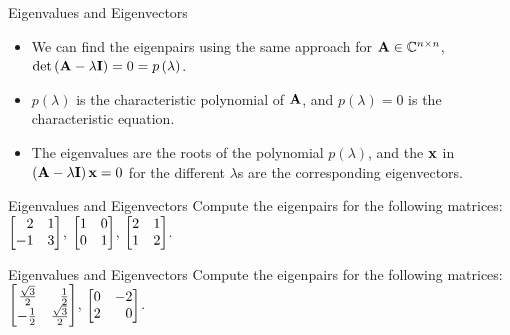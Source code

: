 \documentclass[aspectratio=169]{beamer}
\let\olditem\item
\renewcommand{\item}{\setlength{\itemsep}{\fill}\olditem}
\def\mf{\ensuremath\mathbf}
\def\mb{\ensuremath\mathbb}
\def\bmx{\ensuremath\begin{bmatrix*}[r]}
\def\emx{\ensuremath\end{bmatrix*}}
\begin{document}
\begin{frame}{Eigenvalues and Eigenvectors}
\begin{itemize}
    \item We can find the eigenpairs using the same approach for $\mf{A} \in \mb{C}^{n \times n}$, $\det \left(\mf{A} - \lambda\mf{I}\right) = 0 = p\left(\lambda\right)$.

    \item $p\left(\lambda\right)$ is the characteristic polynomial of $\mf{A}$, and $p\left(\lambda\right) = 0$ is the characteristic equation.

    \item The eigenvalues are the roots of the polynomial $p\left(\lambda \right)$, and the $\mf{x}$ in $\left(\mf{A} - \lambda\mf{I}\right)\mf{x} = 0$ for the different $\lambda$s are the corresponding eigenvectors. 
\end{itemize}
\end{frame}


\begin{frame}[t]{Eigenvalues and Eigenvectors}
Compute the eigenpairs for the following matrices: $\bmx2 & 1\\-1 & 3\emx$, $\bmx1 & 0\\0 & 1\emx$, $\bmx2 & 1\\ 1 & 2\emx$.
\end{frame}


\begin{frame}[t]{Eigenvalues and Eigenvectors}
Compute the eigenpairs for the following matrices: $\bmx\frac{\sqrt{3}}{2} & \frac{1}{2}\\-\frac{1}{2} & \frac{\sqrt{3}}{2}\emx$, $\bmx 0 & -2\\2 & 0\emx$.
\end{frame}
\end{document}
